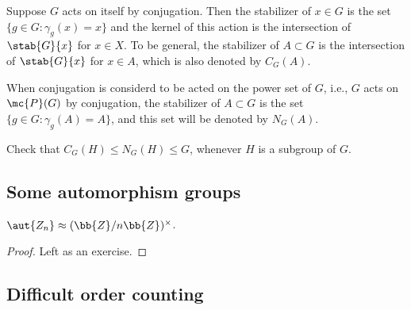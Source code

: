 Suppose $G$ acts on itself by conjugation.
Then the stabilizer of $x\in G$ is the set $\{g\in G: \gamma_g(x)=x\}$ and the kernel of this action is the intersection of $\stab{G}{x}$ for $x\in X$.
To be general, the stabilizer of $A\subset G$ is the intersection of $\stab{G}{x}$ for $x\in A$, which is also denoted by $C_G(A)$.

When conjugation is considerd to be acted on the power set of $G$, i.e., $G$ acts on $\mc{P}(G)$ by conjugation, the stabilizer of $A\subset G$ is the set $\{g\in G: \gamma_g(A)=A\}$, and this set will be denoted by $N_G(A)$.

\begin{prob}
    Check that $C_G(H)\leq N_G(H)\leq G$, whenever $H$ is a subgroup of $G$.
\end{prob}

\subsection{Some automorphism groups}

\begin{thm}
    $\aut{Z_n}\approx (\bb{Z}/n\bb{Z})^\times$.
\end{thm}
\begin{proof}
    \color{brown}Left as an exercise.\color{black}
\end{proof}

\subsection{Difficult order counting}


